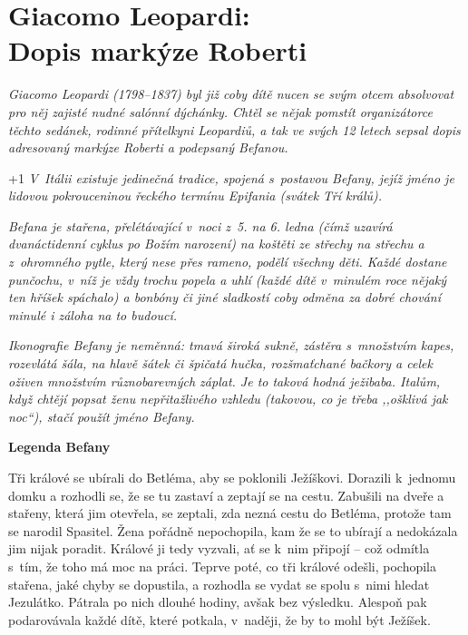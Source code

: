 \section{Giacomo Leopardi: \\ Dopis markýze Roberti}

\noindent
\textit{Giacomo Leopardi (1798--1837) byl již coby dítě nucen se svým otcem absolvovat pro něj zajisté nudné salónní dýchánky. Chtěl se nějak pomstít organizátorce těchto sedánek, rodinné přítelkyni Leopardiů, a tak ve svých 12 letech sepsal dopis adresovaný markýze Roberti a podepsaný Befanou.}

\looseness+1
\textit{V Itálii existuje jedinečná tradice, spojená s postavou Befany, jejíž jméno je lidovou pokrouceninou řeckého termínu Epifania (svátek Tří králů).}

\textit{ Befana je stařena, přelétávající v noci z 5. na 6. ledna (čímž uzavírá dvanáctidenní cyklus po Božím narození) na koštěti ze střechy na střechu a z ohromného pytle, který nese přes rameno, podělí všechny děti. Každé dostane punčochu, v níž je vždy trochu popela a uhlí (každé dítě v minulém roce nějaký ten hříšek spáchalo) a bonbóny či jiné sladkostí coby odměna za dobré chování minulé i záloha na to budoucí.}

\textit{Ikonografie Befany je neměnná: tmavá široká sukně, zástěra s množstvím kapes, rozevlátá šála, na hlavě šátek či špičatá hučka, rozšmaťchané bačkory a celek oživen množstvím různobarevných záplat. Je to taková hodná ježibaba. Italům, když chtějí popsat ženu nepřitažlivého vzhledu (takovou, co je třeba ,,ošklivá jak noc``), stačí použít jméno Befany.}

\medskip

\noindent
\textbf{Legenda Befany}

\noindent
Tři králové se ubírali do Betléma, aby se poklonili Ježíškovi. Dorazili k jednomu domku a rozhodli se, že se tu zastaví a zeptají se na cestu. Zabušili na dveře a stařeny, která jim otevřela, se zeptali, zda nezná cestu do Betléma, protože tam se narodil Spasitel. Žena pořádně nepochopila, kam že se to ubírají a nedokázala jim nijak poradit. Králové ji tedy vyzvali, ať se k nim připojí -- což odmítla s tím, že toho má moc na práci. Teprve poté, co tři králové odešli, pochopila stařena, jaké chyby se dopustila, a rozhodla se vydat se spolu s nimi hledat Jezulátko. Pátrala po nich dlouhé hodiny, avšak bez výsledku. Alespoň pak podarovávala každé dítě, které potkala, v naději, že by to mohl být Ježíšek.

